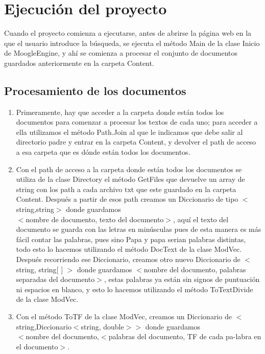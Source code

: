 \documentclass[12pt, a4paper]{article}
\begin{document}
\section{Ejecución del proyecto}

Cuando el proyecto comienza a ejecutarse, antes de abrirse la página web
en la que el usuario introduce la búsqueda, se ejecuta el método Main
de la clase Inicio de MoogleEngine, y ahí se comienza a procesar el conjunto
de documentos guardados anteriormente en la carpeta Content.

\subsection{Procesamiento de los documentos}

\begin{enumerate}
      \item Primeramente, hay que acceder a la carpeta donde están todos los documentos
            para comenzar a procesar los textos de cada uno; para acceder a ella
            utilizamos el método Path.Join al que le indicamos que debe salir al directorio
            padre y entrar en la carpeta Content, y devolver el path de acceso a esa carpeta
            que es dónde están todos los documentos.
      \item Con el path de acceso a la carpeta donde están todos los documentos
            se utiliza de la clase Directory el método GetFiles que devuelve
            un array de string con los path a cada archivo txt que este guardado
            en la carpeta Content. Después a partir de esos path creamos un
            Diccionario de tipo $<$string,string$>$ donde guardamos\\
            $<$nombre de documento, texto del documento$>$, aquí el texto del documento
            se guarda con las letras en minúsculas pues de esta manera es más fácil
            contar las palabras, pues sino Papa y papa serian palabras distintas,
            todo esto lo hacemos utilizando el método DocText de la clase ModVec.
            Después recorriendo ese Diccionario, creamos otro nuevo Diccionario de
            $<$string, string[ ] $>$ donde guardamos
            $<$nombre del documento, palabras separadas del documento$>$,
            estas palabras ya están sin signos de puntuación ni espacios en blanco,
            y esto lo hacemos utilizando el método ToTextDivide de la clase ModVec.
      \item Con el método ToTF de la clase ModVec, creamos un Diccionario de
            $<$string,Diccionario$<$string, double$>$$>$ donde guardamos\\
            $<$nombre del documento,$<$palabras del documento, TF de cada pa-labra en el documento$>$.\\
            

\end{enumerate}
\end{document}
